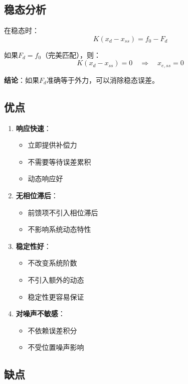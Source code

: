 \documentclass[12pt,a4paper]{article}
\begin{document}
\subsection{稳态分析}

在稳态时：
\begin{equation}
K(x_d - x_{ss}) = f_0 - F_d
\end{equation}

如果$F_d = f_0$（完美匹配），则：
\begin{equation}
K(x_d - x_{ss}) = 0 \quad \Rightarrow \quad x_{e,ss} = 0
\end{equation}

\textbf{结论}：如果$F_d$准确等于外力，可以消除稳态误差。

\subsection{优点}

\begin{enumerate}
\item \textbf{响应快速}：
\begin{itemize}
\item 立即提供补偿力
\item 不需要等待误差累积
\item 动态响应好
\end{itemize}

\item \textbf{无相位滞后}：
\begin{itemize}
\item 前馈项不引入相位滞后
\item 不影响系统动态特性
\end{itemize}

\item \textbf{稳定性好}：
\begin{itemize}
\item 不改变系统阶数
\item 不引入额外的动态
\item 稳定性更容易保证
\end{itemize}

\item \textbf{对噪声不敏感}：
\begin{itemize}
\item 不依赖误差积分
\item 不受位置噪声影响
\end{itemize}
\end{enumerate}

\subsection{缺点}
\end{document}
